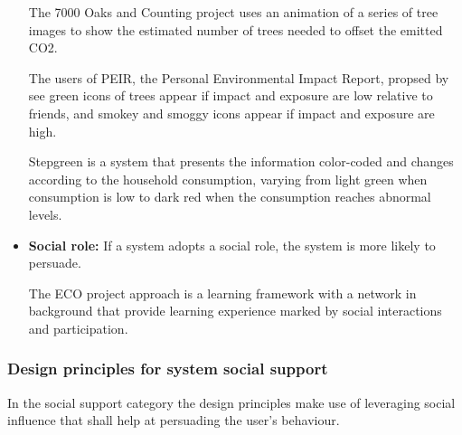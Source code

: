 \begin{itemize}
	The 7000 Oaks and Counting project \cite{holmes2007eco} uses an animation of a series of tree images to show the estimated number of trees needed to offset the emitted CO2.
	
	The users of PEIR, the Personal Environmental Impact Report, propsed by \cite{mun2009peir} see green icons of trees appear if impact and exposure are low relative to friends, and smokey and smoggy icons
	appear if impact and exposure are high.
	
	Stepgreen \cite{pereira2012design} is a system that presents the information color-coded and changes according to the household
	consumption, varying from light green when consumption is low to dark red when the consumption reaches abnormal levels.
	
	\item \textbf{Social role:}
	If a system adopts a social	role, the system is more likely to persuade.

	The ECO project approach is a learning framework with a network in background that \cite{brouns2014networked} provide learning experience marked by social interactions and participation.
	
	 
\end{itemize}

\subsubsection{Design principles for system social support}
\label{subsubsec:socialsupport}

In the social support category the design principles make use of leveraging social influence that shall help at persuading the user's behaviour.

